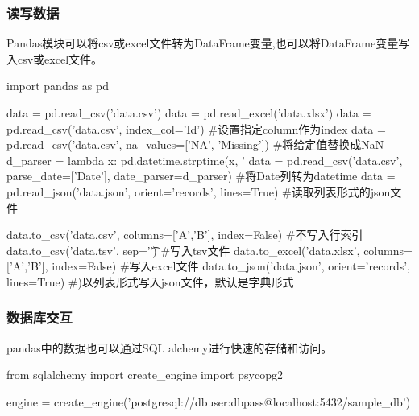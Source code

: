     \subsubsection{读写数据}
      Pandas模块可以将csv或excel文件转为DataFrame变量,也可以将DataFrame变量写入csv或excel文件。
      \begin{codeblock}[language=python, caption={Read and write files using Pandas}]
        import pandas as pd

        data = pd.read_csv('data.csv')
        data = pd.read_excel('data.xlsx')
        data = pd.read_csv('data.csv', index_col='Id') #设置指定column作为index
        data = pd.read_csv('data.csv', na_values=['NA', 'Missing']) #将给定值替换成NaN
        d_parser = lambda x: pd.datetime.strptime(x, '%
        data = pd.read_csv('data.csv', parse_date=['Date'], date_parser=d_parser) 
            #将Date列转为datetime
        data = pd.read_json('data.json', orient='records', lines=True) 
            #读取列表形式的json文件

        data.to_csv('data.csv', columns=['A','B'], index=False) #不写入行索引
        data.to_csv('data.tsv', sep='\t') #写入tsv文件
        data.to_excel('data.xlsx', columns=['A','B'], index=False) #写入excel文件
        data.to_json('data.json', orient='records', lines=True) #)以列表形式写入json文件，默认是字典形式
      \end{codeblock}

    \subsubsection{数据库交互}
      pandas中的数据也可以通过SQL alchemy进行快速的存储和访问。
      \begin{codeblock}[language=python, caption={pandas \& database}]
        from sqlalchemy import create_engine
        import psycopg2

        engine = create_engine('postgresql://dbuser:dbpass@localhost:5432/sample_db')
      \end{codeblock}

